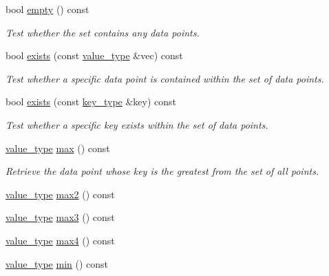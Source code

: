 \begin{DoxyCompactItemize}
bool \hyperlink{classmetrobotics_1_1Lerp_aaa9cb47196fe501994cc0c86e5543f1b}{empty} () const 
\begin{DoxyCompactList}\small\item\em \-Test whether the set contains any data points. \end{DoxyCompactList}\item 
bool \hyperlink{classmetrobotics_1_1Lerp_aea3a0d4ffa69f810c42f90be809441e2}{exists} (const \hyperlink{classmetrobotics_1_1Lerp_ab1be5a6a96856f10c5eadc416d630a40}{value\-\_\-type} \&vec) const 
\begin{DoxyCompactList}\small\item\em \-Test whether a specific data point is contained within the set of data points. \end{DoxyCompactList}\item 
bool \hyperlink{classmetrobotics_1_1Lerp_a37f9270ce1cdf3d2ed4ba12e1ae41fc9}{exists} (const \hyperlink{classmetrobotics_1_1Lerp_a3cd6f9215623083b5ed90f4c03ac6dc7}{key\-\_\-type} \&key) const 
\begin{DoxyCompactList}\small\item\em \-Test whether a specific key exists within the set of data points. \end{DoxyCompactList}\item 
\hyperlink{classmetrobotics_1_1Lerp_ab1be5a6a96856f10c5eadc416d630a40}{value\-\_\-type} \hyperlink{classmetrobotics_1_1Lerp_a846e1b0be29fff0a03eccda9e240db8a}{max} () const 
\begin{DoxyCompactList}\small\item\em \-Retrieve the data point whose key is the greatest from the set of all points. \end{DoxyCompactList}\item 
\hyperlink{classmetrobotics_1_1Lerp_ab1be5a6a96856f10c5eadc416d630a40}{value\-\_\-type} \hyperlink{classmetrobotics_1_1Lerp_a58753f827f435117688c049e5ca77880}{max2} () const 
\item 
\hyperlink{classmetrobotics_1_1Lerp_ab1be5a6a96856f10c5eadc416d630a40}{value\-\_\-type} \hyperlink{classmetrobotics_1_1Lerp_a8956b5651fd41ca8ed851b78ef93163c}{max3} () const 
\item 
\hyperlink{classmetrobotics_1_1Lerp_ab1be5a6a96856f10c5eadc416d630a40}{value\-\_\-type} \hyperlink{classmetrobotics_1_1Lerp_a6a20b7548c7e7a4d2b664e50b4d2d5f2}{max4} () const 
\item 
\hyperlink{classmetrobotics_1_1Lerp_ab1be5a6a96856f10c5eadc416d630a40}{value\-\_\-type} \hyperlink{classmetrobotics_1_1Lerp_ae2ec25f3e7dc72d6f03f99e84687865a}{min} () const 

\end{DoxyCompactItemize}
